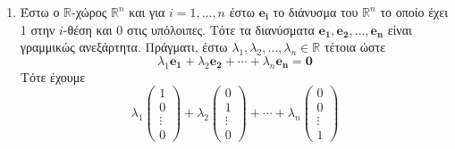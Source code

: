 \begin{examples}
\begin{enumerate}
\begin{equation*}
\begin{array}{ccc ccc c @{\extracolsep{2.5pt}}c
                  @{\extracolsep{2.5pt}}c}
              u_{11} \lambda _{1} & + & u_{21} \lambda _{2} & + & 
              \cdots & + & u_{k1}\lambda_{k} & = & 0 \\
              u_{12}\lambda_{1} & + & u_{22}\lambda_{2} & + & \cdots & 
              + & u_{k2}\lambda_{k} & = & 0 \\
              \vdots & & \vdots & & \ddots & &  \vdots & &  \vdots \\
              u_{1n}\lambda_{1} & + & u_{2n}\lambda_{2} & + & \cdots & 
              + & u_{kn}\lambda_{k} & = & 0 \\
            \end{array}
          \right\} _{n \times k}
            \end{equation*}    
            έχει τουλάχιστον μια μη μηδενική λύση, το οποίο προφανώς ισχύει 
            (από γνωστό θεώρημα), αφού λόγω ότι $ n<k $ το σύστημα έχει 
            περισσότερους αγνώστους από εξισώσεις και λόγω ότι είναι και 
            ομογενές θα έχει άπειρες λύσεις.
          \item Έστω ο $ \mathbb{R} $-χώρος $ \mathbb{R}^{n} $ και για $ i= 1,\ldots,n $
            έστω $ \mathbf{e_{i}} $ το διάνυσμα του $ \mathbb{R}^{n} $ το οποίο έχει 
            1 στην $ i $-θέση και 0 στις υπόλοιπες. Τότε τα διανύσματα 
            $ \mathbf{e_{1}}, \mathbf{e_{2}}, \ldots, \mathbf{e_{n}} $ είναι 
            γραμμικώς ανεξάρτητα. Πράγματι, έστω 
            $ \lambda _{1}, \lambda _{2}, \ldots, \lambda _{n} \in \mathbb{R} $ 
            τέτοια ώστε 
            \[
              \lambda _{1} \mathbf{e_{1}}+ \lambda _{2} \mathbf{e_{2}} 
              + \cdots + \lambda _{n} \mathbf{e_{n}}= \mathbf{0}  
            \]
            Τότε έχουμε
            \[
              \lambda _{1} 
              \begin{pmatrix*} 1 \\ 0 \\ \vdots \\ 0 \end{pmatrix*} 
              + \lambda _{2} 
              \begin{pmatrix*} 0 \\ 1 \\ \vdots \\ 0 \end{pmatrix*}
              + \cdots + \lambda _{n} 
              \begin{pmatrix*} 0 \\ 0 \\ \vdots \\ 1 \end{pmatrix*}
\]
\end{enumerate}
\end{examples}

